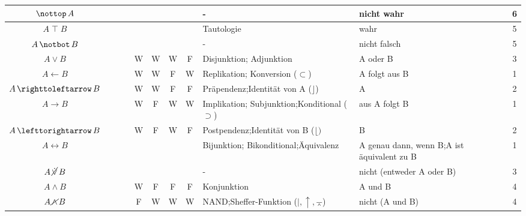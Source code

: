 \documentclass[english,ngerman,parskip=half,headsepline,footsepline]{scrreprt}
\newcommand*{\texttrue}{W}
\newcommand*{\textfalse}{F}
\newcommand*{\lnutrue}{\operatorname{\nottop}}  %
\newcommand*{\lbtrue}{\operatorname{\top}}              %
\newcommand*{\lnbfalse}{\operatorname{\notbot}}         %
\newcommand*{\lnxor}{\operatorname{\cancel{\lxor}}}     %
\newcommand*{\lleftimp}{\operatorname{\leftarrow}}      %
\newcommand*{\lleft}{\operatorname{\righttoleftarrow}}  %
\newcommand*{\limp}{\operatorname{\rightarrow}}         %
\newcommand*{\lright}{\operatorname{\lefttorightarrow}} %
\newcommand*{\lequiv}{\operatorname{\leftrightarrow}}   %
\newcommand*{\lnand}{\operatorname{\cancel{\land}}}     %
\newcommand*{\lxor}{\operatorname{\dot{\lor}}}          %
\begin{document}
\begin{table}
\begin{threeparttable}
\begin{tabularx}{\linewidth}{c||c:cc:cccc|X:X|c|}
				\gapline %
				$\lnutrue A$&&&&&&&&-&nicht wahr&6\\
				\hline %
				$A\lbtrue B$&&&&\mrW&\mrW&\mrW&\mrW&Tautologie&wahr&5\\
				\gapline %
				$A\lnbfalse B$&&&&&&&&-&nicht falsch&5\\
				\tableline %
				$A\lor B$&&&&\texttrue&\texttrue&\texttrue&\textfalse&Disjunktion; Adjunktion&A oder B&3\\
				\tableline %
				$A\lleftimp B$&&&&\texttrue&\texttrue&\textfalse&\texttrue&Replikation; Konversion ($\subset$)&A folgt aus B&1\\
				\tableline %
				$A\lleft B$&&&&\texttrue&\texttrue&\textfalse&\textfalse&Präpendenz;\newline Identität von A ($\rfloor$)&A&2\\
				\tablegroup %
				$A\limp B$&&&&\texttrue&\textfalse&\texttrue&\texttrue&Implikation; Subjunktion;\newline Konditional ($\supset$)&aus A folgt B&1\\
				\tableline %
				$A\lright B$&&&&\texttrue&\textfalse&\texttrue&\textfalse&Postpendenz;\newline Identität von B ($\lfloor)$&B&2\\
				\tableline %
				$A\lequiv B$&&&&\mrW&\mrF&\mrF&\mrW&Bijunktion; Bikonditional;\newline Äquivalenz&A genau dann, wenn B;\newline A ist äquivalent zu B&1\\
				\gapline %
				$A\lnxor B$&&&&&&&&-&nicht (entweder A oder B)&3\\
				\tableline %
				$A\land B$&&&&\texttrue&\textfalse&\textfalse&\textfalse&Konjunktion&A und B&4\\
				\tablegroup %
				$A\lnand B$&&&&\textfalse&\texttrue&\texttrue&\texttrue&NAND;\newline Sheffer-Funktion ($\mid, \uparrow, \barwedge$)&nicht (A und B)&4\\

\end{tabularx}
\end{threeparttable}
\end{table}
\end{document}
